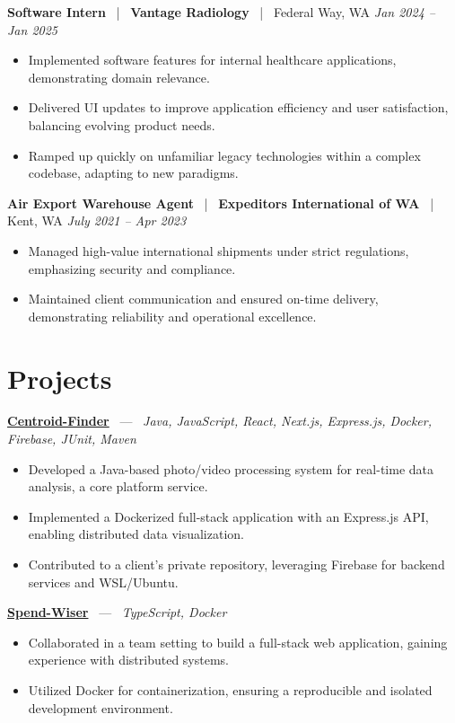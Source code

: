 \documentclass[10pt, letterpaper]{article}
\newcommand{\jobhead}[4]{%
  \vspace{5pt}%
  {\bfseries\color{dark}#1}%
  ~{\color{light}|}~%
  {\bfseries\color{navy}#2}%
  ~{\color{light}|}~%
  {\color{light}#3}%
  \hfill{\color{light}\small\textit{#4}}\\[-2pt]%
}
\newcommand{\projhead}[3]{%
  \vspace{5pt}%
  {\bfseries\color{dark}\href{#2}{#1}}%
  ~{\color{light}---}~%
  {\color{light}\small\textit{#3}}\\[-2pt]%
}
\begin{document}
\jobhead{Software Intern}{Vantage Radiology}{Federal Way, WA}{Jan 2024 – Jan 2025}
\begin{itemize}
  \item Implemented software features for internal healthcare applications, demonstrating domain relevance.
  \item Delivered UI updates to improve application efficiency and user satisfaction, balancing evolving product needs.
  \item Ramped up quickly on unfamiliar legacy technologies within a complex codebase, adapting to new paradigms.
\end{itemize}

\jobhead{Air Export Warehouse Agent}{Expeditors International of WA}{Kent, WA}{July 2021 – Apr 2023}
\begin{itemize}
  \item Managed high-value international shipments under strict regulations, emphasizing security and compliance.
  \item Maintained client communication and ensured on-time delivery, demonstrating reliability and operational excellence.
\end{itemize}

\section{Projects}

\projhead{Centroid-Finder}{https://github.com/xavierb117/centroid-finder}{Java, JavaScript, React, Next.js, Express.js, Docker, Firebase, JUnit, Maven}
\begin{itemize}
  \item Developed a Java-based photo/video processing system for real-time data analysis, a core platform service.
  \item Implemented a Dockerized full-stack application with an Express.js API, enabling distributed data visualization.
  \item Contributed to a client's private repository, leveraging Firebase for backend services and WSL/Ubuntu.
\end{itemize}

\projhead{Spend-Wiser}{https://github.com/JesseChum/w26-sdev372-spendwiser-finance-tracker}{TypeScript, Docker}
\begin{itemize}
  \item Collaborated in a team setting to build a full-stack web application, gaining experience with distributed systems.
  \item Utilized Docker for containerization, ensuring a reproducible and isolated development environment.
\end{itemize}
\end{document}
